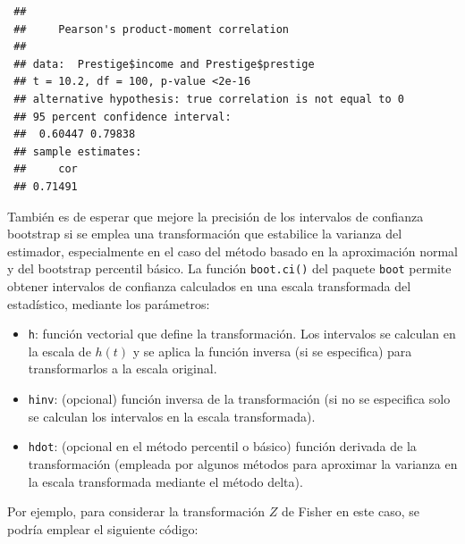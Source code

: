 \documentclass[
  spanish,
  10pt,
]{book}
\theoremstyle{break}
\theoremstyle{nonumberplain}
\begin{document}
\begin{verbatim}
 ## 
 ##     Pearson's product-moment correlation
 ## 
 ## data:  Prestige$income and Prestige$prestige
 ## t = 10.2, df = 100, p-value <2e-16
 ## alternative hypothesis: true correlation is not equal to 0
 ## 95 percent confidence interval:
 ##  0.60447 0.79838
 ## sample estimates:
 ##     cor 
 ## 0.71491
\end{verbatim}

También es de esperar que mejore la precisión de los intervalos de confianza bootstrap si se emplea una transformación que estabilice la varianza del estimador, especialmente en el caso del método basado en la aproximación normal y del bootstrap percentil básico.
La función \texttt{boot.ci()} del paquete \texttt{boot} permite obtener intervalos de confianza calculados en una escala transformada del estadístico, mediante los parámetros:

\begin{itemize}
\item
  \texttt{h}: función vectorial que define la transformación.
  Los intervalos se calculan en la escala de \(h(t)\) y se aplica la función inversa (si se especifica) para transformarlos a la escala original.
\item
  \texttt{hinv}: (opcional) función inversa de la transformación
  (si no se especifica solo se calculan los intervalos en la escala transformada).
\item
  \texttt{hdot}: (opcional en el método percentil o básico) función derivada de la transformación
  (empleada por algunos métodos para aproximar la varianza en la escala transformada mediante el método delta).
\end{itemize}

Por ejemplo, para considerar la transformación \(Z\) de Fisher en este caso, se podría emplear el siguiente código:
\end{document}
